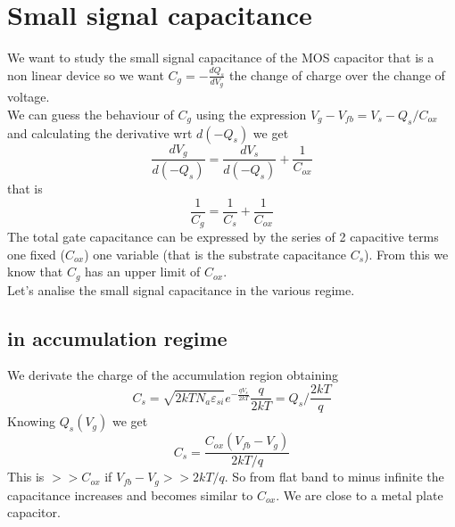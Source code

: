 \section{Small signal capacitance}
We want to study the small signal capacitance of the MOS capacitor that is a non linear device so we want $C_g=-\frac{dQ_s}{dV_g}$ the change of charge over the change of voltage.\\
We can guess the behaviour of $C_g$ using the expression $V_g-V_{fb}=V_s-Q_s/C_{ox}$ and calculating the derivative wrt $d(-Q_s)$ we get
\begin{equation}
\frac{dV_g}{d(-Q_s)}=\frac{dV_s}{d(-Q_s)}+\frac{1}{C_{ox}}
\end{equation}
that is 
\begin{equation}
\frac{1}{C_g}=\frac{1}{C_s}+\frac{1}{C_{ox}}
\end{equation}
The total gate capacitance can be expressed by the series of 2 capacitive terms one fixed ($C_{ox}$) one variable (that is the substrate capacitance $C_s$). From this we know that $C_g$ has an upper limit of $C_{ox}$.\\
Let's analise the small signal capacitance in the various regime.\\

\subsection{in accumulation regime}
We derivate the charge of the accumulation region obtaining 
\begin{equation}
C_s=\sqrt{2kTN_a\varepsilon_{si}}e^{-\frac{qV_s}{2kT}}\frac{q}{2kT}=Q_s/\frac{2kT}{q}
\end{equation}
Knowing $Q_s(V_g)$ we get 
\begin{equation}
C_s=\frac{C_{ox}(V_{fb}-V_g)}{2kT/q}
\end{equation}
This is $>>C_{ox}$ if $V_{fb}-V_g>>2kT/q$. So from flat band to minus infinite the capacitance increases and becomes similar to $C_{ox}$. We are close to a metal plate capacitor.\\

